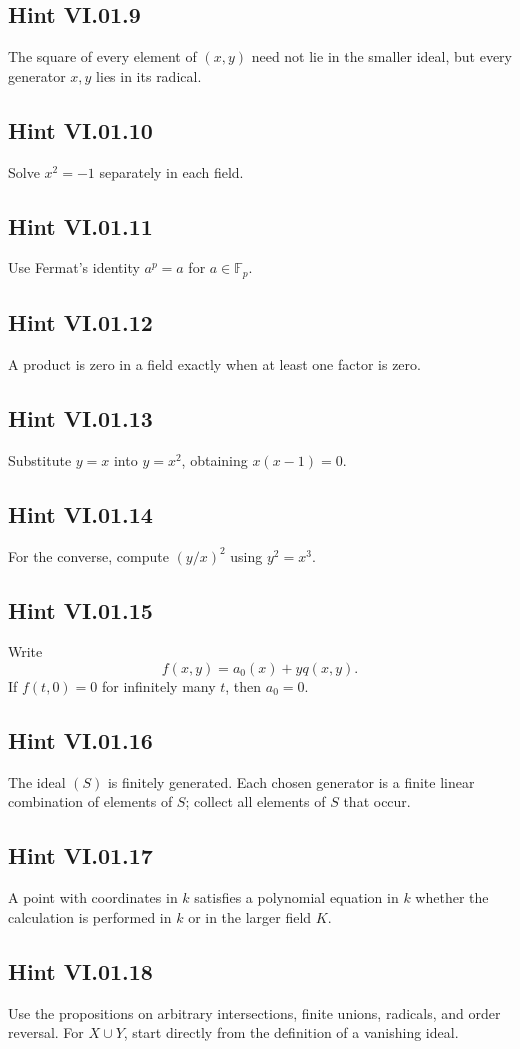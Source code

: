 \subsection*{Hint VI.01.9}
The square of every element of \((x,y)\) need not lie in the smaller ideal, but every
generator \(x,y\) lies in its radical.

\subsection*{Hint VI.01.10}
Solve \(x^2=-1\) separately in each field.

\subsection*{Hint VI.01.11}
Use Fermat's identity \(a^p=a\) for \(a\in\mathbb F_p\).

\subsection*{Hint VI.01.12}
A product is zero in a field exactly when at least one factor is zero.

\subsection*{Hint VI.01.13}
Substitute \(y=x\) into \(y=x^2\), obtaining \(x(x-1)=0\).

\subsection*{Hint VI.01.14}
For the converse, compute \((y/x)^2\) using \(y^2=x^3\).

\subsection*{Hint VI.01.15}
Write
\[
  f(x,y)=a_0(x)+yq(x,y).
\]
If \(f(t,0)=0\) for infinitely many \(t\), then \(a_0=0\).

\subsection*{Hint VI.01.16}
The ideal \((S)\) is finitely generated.  Each chosen generator is a finite linear
combination of elements of \(S\); collect all elements of \(S\) that occur.

\subsection*{Hint VI.01.17}
A point with coordinates in \(k\) satisfies a polynomial equation in \(k\) whether the
calculation is performed in \(k\) or in the larger field \(K\).

\subsection*{Hint VI.01.18}
Use the propositions on arbitrary intersections, finite unions, radicals, and order
reversal.  For \(X\cup Y\), start directly from the definition of a vanishing ideal.
